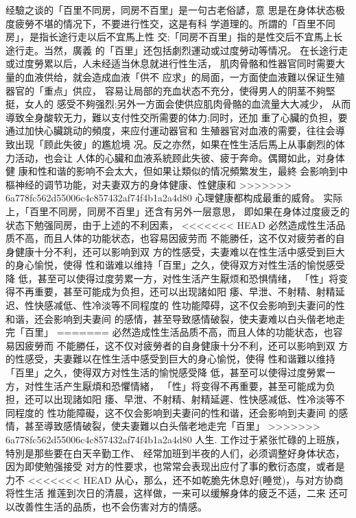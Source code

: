\documentclass[12pt,UTF8]{ctexbook}
\begin{document}
经驗之谈的「百里不同房，同房不百里」是一句古老俗諺，意
思是在身体状态极度疲勞不堪的情况下，不要进行性交，这是有科
学道理的。所謂的「百里不同房」，是指长途行走以后不宜馬上性
交;「同房不百里」指的是性交后不宜馬上长途行走。当然，廣義
的「百里」还包括劇烈運动或过度勞动等情况。
在长途行走或过度勞累以后，人未经适当休息就进行性生活，
肌肉骨骼和性器官同时需要大量的血液供给，就会造成血液「供不
应求」的局面，一方面使血液難以保证生殖器官的「重点」供应，
容易让局部的充血状态不充分，使得男人的阴茎不夠堅挺，女人的
感受不夠强烈;另外一方面会使供应肌肉骨骼的血流量大大减少，
从而導致全身酸软无力，難以支付性交所需要的体力;同时，还加
重了心臟的负担，要通过加快心臟跳动的頻度，来应付運动器官和
生殖器官对血液的需要，往往会導致出现「顾此失彼」的尷尬境
况。反之亦然，如果在性生活后馬上从事劇烈的体力活动，也会让
人体的心臟和血液系統顾此失彼、疲于奔命。偶爾如此，对身体健
康和性和谐的影响不会太大，但如果让類似的情况頻繁发生，最終
会影响到中樞神经的调节功能，对夫妻双方的身体健康、性健康和
>>>>>>> 6a778fc562d55006c4c857432af74f4b1a2a4d80
心理健康都构成最重的威脅。
实际上，「百里不同房，同房不百里」还含有另外一层意思，
即如果在身体过度疲乏的状态下勉强同房，由于上述的不利因素，
<<<<<<< HEAD
必然造成性生活品质不高，而且人体的功能状态，也容易因疲劳而
不能勝任，这不仅对疲劳者的自身健康十分不利，还可以影响到双
方的性感受，夫妻难以在性生活中感受到巨大的身心愉悦，使得
性和谐难以维持「百里」之久，使得双方对性生活的愉悦感受降
低，甚至可以使得过度劳累一方，对性生活产生厭烦和恐惧情绪，
「性」将变得不再重要，甚至可能成为负担，还可以出现諸如阳
痿、早泄、不射精、射精延迟、性快感减低、性冷淡等不同程度的
性功能障碍，这不仅会影响到夫妻问的性和谐，还会影响到夫妻间
的感情，甚至导致感情破裂，使夫妻难以白头偕老地走完「百里」
=======
必然造成性生活品质不高，而且人体的功能状态，也容易因疲勞而
不能勝任，这不仅对疲勞者的自身健康十分不利，还可以影响到双
方的性感受，夫妻難以在性生活中感受到巨大的身心愉悦，使得
性和谐難以维持「百里」之久，使得双方对性生活的愉悦感受降
低，甚至可以使得过度勞累一方，对性生活产生厭煩和恐懼情緒，
「性」将变得不再重要，甚至可能成为负担，还可以出现諸如阳
痿、早泄、不射精、射精延遲、性快感减低、性冷淡等不同程度的
性功能障礙，这不仅会影响到夫妻问的性和谐，还会影响到夫妻间
的感情，甚至導致感情破裂，使夫妻難以白头偕老地走完「百里」
>>>>>>> 6a778fc562d55006c4c857432af74f4b1a2a4d80
人生.
工作过于紧张忙碌的上班族，特別是那些要在白天辛勤工作、
经常加班到半夜的人们，必须调整好身体状态，因为即使勉强接受
对方的性要求，也常常会表现出应付了事的敷衍态度，或者是力不
<<<<<<< HEAD
从心，那么，还不如乾脆先休息好(睡觉)，与对方协商将性生活
推莲到次日的清晨，这样做，一来可以缓解身体的疲乏不适，二来
还可以改善性生活的品质，也不会伤害对方的情感。
\end{document}
